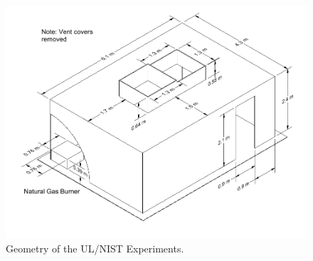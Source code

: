 \begin{figure}[ht]
\includegraphics[width=\textwidth]{FIGURES/UL_NIST_Vents/UL_NIST_Vents_Drawing}
\caption{Geometry of the UL/NIST Experiments.}
\label{UL_NIST_Drawing}
\end{figure}


